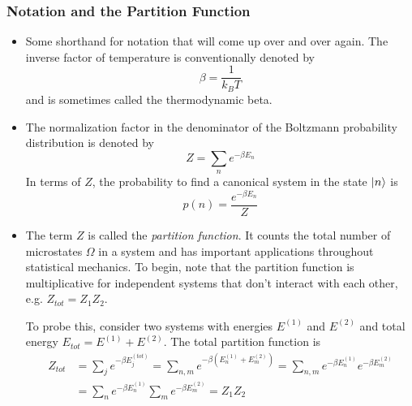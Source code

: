 \documentclass[11pt, a4paper]{article}
\begin{document}
\subsubsection{Notation and the Partition Function}
\begin{itemize}
	\item Some shorthand for notation that will come up over and over again. The inverse factor of temperature is conventionally denoted by
	\begin{equation*}
		\beta = \frac{1}{k_{B}T}
	\end{equation*}
	and is sometimes called the thermodynamic beta.
	
	\item The normalization factor in the denominator of the Boltzmann probability distribution is denoted by
	\begin{equation*}
		Z = \sum_{n} e^{-\beta E_{n}}
	\end{equation*}
	In terms of $ Z $, the probability to find a canonical system in the state $ \ket{n} $ is
	\begin{equation*}
		p(n) = \frac{e^{-\beta E_{n}}}{Z}
	\end{equation*}

	\item The term $ Z $ is called the \textit{partition function}. It counts the total number of microstates $ \Omega $ in a system and has important applications throughout statistical mechanics. To begin, note that the partition function is multiplicative for independent systems that don't interact with each other, e.g. $ Z_{tot} = Z_{1}Z_{2} $.
	
	To probe this, consider two systems with energies $ E^{(1)} $ and $ E^{(2)} $ and total energy $ E_{tot} =  E^{(1)} + E^{(2)} $. The total partition function is 
	\begin{align*}
		Z_{tot} &= \sum_{j} e^{-\beta E^{(tot)}_{j}} = \sum_{n, m}e^{-\beta (E^{(1)}_{n} + E^{(2)}_{m} )} = \sum_{n, m}e^{-\beta E^{(1)}_{n}}e^{-\beta E^{(2)}_{m}}\\
		&=\sum_{n}e^{-\beta E^{(1)}_{n}} \sum_{m}e^{-\beta E^{(2)}_{m}} = Z_{1}Z_{2}
	\end{align*}
\end{itemize}
\end{document}
